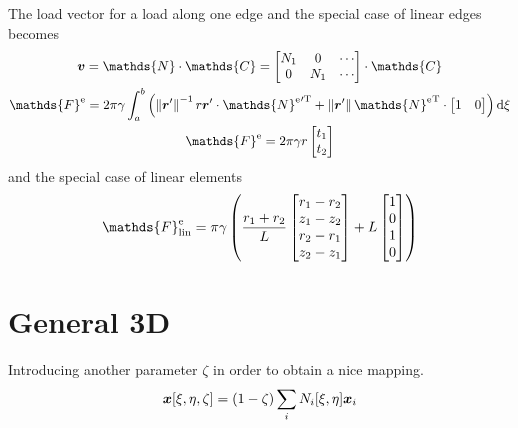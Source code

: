 \documentclass[a4paper,11pt]{article}
\renewcommand{\to}[1]{\text{\boldmath $#1$}} %
\newcommand{\um}[1]{\mathds{#1}}
\newcommand{\intd}[1]{{\rm d}#1}
\newcommand{\norm}[1]{\left\lVert{#1}\right\rVert}
\newcommand{\T}{{\rm T}}
\newcommand{\element}{{\rm e}}
\newcommand{\linear}{{\rm lin}}
\begin{document}
The load vector for a load along one edge and the special case of linear edges becomes
\begin{gather}
 \to v = \um{N}\cdot\um{C} = \begin{bmatrix}N_1 & 0 & \cdots\\ 0 & N_1 & \cdots \end{bmatrix}\cdot \um{C}\\
 \um F^\element = 2\pi \gamma \int_a^b \left(\norm{\to r'}^{-1}r\to r'\cdot{\um N^\element}'^\T + \norm{\to r'}{\um N^\element}^\T\cdot\begin{bmatrix}1&0\end{bmatrix}\right) \intd\xi\\
 \um F^\element = 2\pi \gamma r \begin{bmatrix}t_1\\t_2\end{bmatrix}
\end{gather}
and the special case of linear elements
\begin{gather}
 \um F^\element_\linear = \pi \gamma \left(\frac{r_1+r_2}{L}\begin{bmatrix}r_1-r_2\\z_1-z_2\\r_2-r_1\\z_2-z_1\end{bmatrix} + L\begin{bmatrix}1\\0\\1\\0\end{bmatrix}\right)
\end{gather}

\section{General 3D}

Introducing another parameter $\zeta$ in order to obtain a nice mapping.
\begin{align}
 \to x[\xi,\eta,\zeta] = (1-\zeta)\sum_i N_i[\xi,\eta]\to x_i
\end{align}
\end{document}
